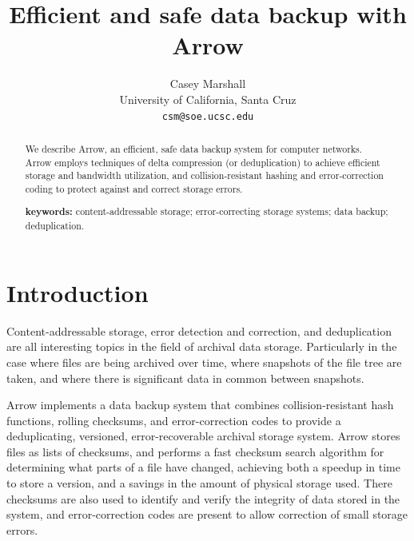 \documentclass{article}
\begin{document}
\title{Efficient and safe data backup with Arrow}
\author{Casey Marshall \\
  University of California, Santa Cruz \\
  \texttt{csm@soe.ucsc.edu}}

\maketitle

\begin{abstract}
  We describe Arrow, an efficient, safe data backup system for
  computer networks. Arrow employs techniques of delta compression (or
  deduplication) to achieve efficient storage and bandwidth
  utilization, and collision-resistant hashing and error-correction
  coding to protect against and correct storage errors.

  \medskip

  \noindent\textbf{keywords:} content-addressable storage;
  error-correcting storage systems; data backup; deduplication.
\end{abstract}

\section{Introduction}

Content-addressable storage, error detection and correction, and
deduplication are all interesting topics in the field of archival data
storage. Particularly in the case where files are being archived over
time, where snapshots of the file tree are taken, and where there is
significant data in common between snapshots.

Arrow implements a data backup system that combines
collision-resistant hash functions, rolling checksums, and
error-correction codes to provide a deduplicating, versioned,
error-recoverable archival storage system. Arrow stores files as lists
of checksums, and performs a fast checksum search algorithm for
determining what parts of a file have changed, achieving both a
speedup in time to store a version, and a savings in the amount of
physical storage used. There checksums are also used to identify and
verify the integrity of data stored in the system, and
error-correction codes are present to allow correction of small
storage errors.
\end{document}
